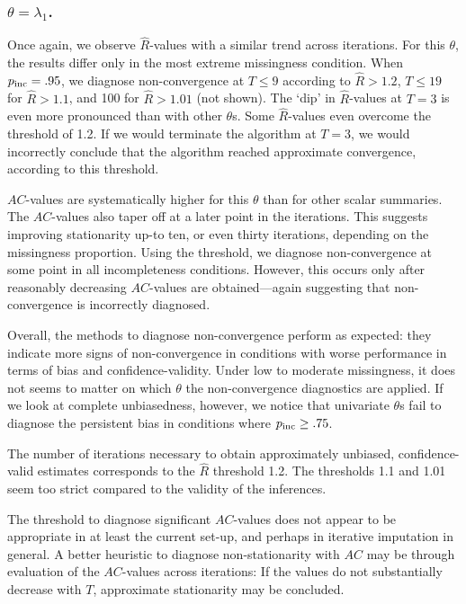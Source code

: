 \documentclass[Royal,times,sageh]{sagej}
\begin{document}
\hypertarget{thetalambda_1.}{%
\subsubsection{\texorpdfstring{\(\theta=\lambda_{1}\).}{\textbackslash theta=\textbackslash lambda\_\{1\}.}}\label{thetalambda_1.}}

Once again, we observe \(\widehat{R}\)-values with a similar trend across iterations. For this \(\theta\), the results differ only in the most extreme missingness condition. When \(p_{\rm inc}=.95\), we diagnose non-convergence at \(T\leq9\) according to \(\widehat{R}>1.2\), \(T\leq19\) for \(\widehat{R}>1.1\), and 100 for \(\widehat{R}>1.01\) (not shown). The `dip' in \(\widehat{R}\)-values at \(T=3\) is even more pronounced than with other \(\theta\)s. Some \(\widehat{R}\)-values even overcome the threshold of 1.2. If we would terminate the algorithm at \(T=3\), we would incorrectly conclude that the algorithm reached approximate convergence, according to this threshold.

\(AC\)-values are systematically higher for this \(\theta\) than for other scalar summaries. The \(AC\)-values also taper off at a later point in the iterations. This suggests improving stationarity up-to ten, or even thirty iterations, depending on the missingness proportion. Using the threshold, we diagnose non-convergence at some point in all incompleteness conditions. However, this occurs only after reasonably decreasing \(AC\)-values are obtained---again suggesting that non-convergence is incorrectly diagnosed. \newline  

\noindent Overall, the methods to diagnose non-convergence perform as expected: they indicate more signs of non-convergence in conditions with worse performance in terms of bias and confidence-validity. Under low to moderate missingness, it does not seems to matter on which \(\theta\) the non-convergence diagnostics are applied. If we look at complete unbiasedness, however, we notice that univariate \(\theta\)s fail to diagnose the persistent bias in conditions where \(p_{\rm inc}\geq.75\).

The number of iterations necessary to obtain approximately unbiased, confidence-valid estimates corresponds to the \(\widehat{R}\) threshold 1.2. The thresholds 1.1 and 1.01 seem too strict compared to the validity of the inferences.

The threshold to diagnose significant \(AC\)-values does not appear to be appropriate in at least the current set-up, and perhaps in iterative imputation in general. A better heuristic to diagnose non-stationarity with \(AC\) may be through evaluation of the \(AC\)-values across iterations: If the values do not substantially decrease with \(T\), approximate stationarity may be concluded.
\end{document}

